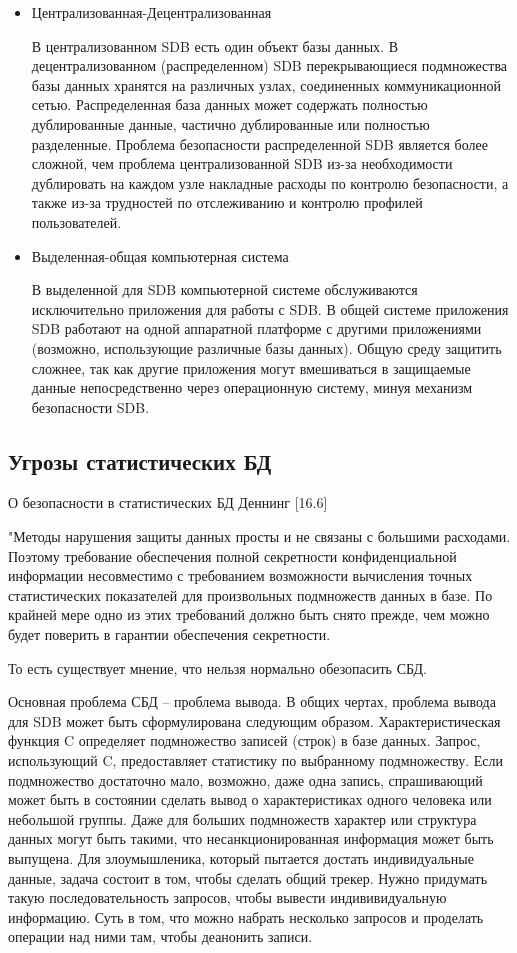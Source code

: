 \begin{itemize}
    \item Централизованная-Децентрализованная

В централизованном SDB есть один объект базы данных. В децентрализованном (распределенном) SDB перекрывающиеся подмножества базы данных хранятся на различных узлах, соединенных коммуникационной сетью. Распределенная база данных может содержать полностью дублированные данные, частично дублированные или полностью разделенные. Проблема безопасности распределенной SDB является более сложной, чем проблема централизованной SDB из-за необходимости дублировать на каждом узле накладные расходы по контролю безопасности, а также из-за трудностей по отслеживанию и контролю профилей пользователей.

	\item Выделенная-общая компьютерная система

В выделенной для SDB компьютерной системе обслуживаются исключительно приложения для работы с SDB. В общей системе приложения SDB работают на одной аппаратной платформе с другими приложениями (возможно, использующие различные базы данных). Общую среду защитить сложнее, так как другие приложения могут вмешиваться в защищаемые данные непосредственно через операционную систему, минуя механизм безопасности SDB.
\end{itemize}
\subsection{Угрозы статистических БД}

О безопасности в статистических БД  Деннинг [16.6]
\begin{grayquote}
"Методы нарушения защиты данных просты и не связаны с большими расходами. Поэтому требование обеспечения полной секретности конфиденциальной информации несовместимо с требованием возможности вычисления точных статистических показателей для произвольных подмножеств данных в базе. По крайней мере одно из этих требований должно быть снято прежде, чем можно будет поверить в гарантии обеспечения секретности.
\end{grayquote}
То есть существует мнение, что нельзя нормально обезопасить СБД.

Основная проблема СБД -- проблема вывода.
В общих чертах, проблема вывода для SDB может быть сформулирована следующим образом. Характеристическая функция C определяет подмножество записей (строк) в базе данных. Запрос, использующий C, предоставляет статистику по выбранному подмножеству. Если подмножество достаточно мало, возможно, даже одна запись, спрашивающий может быть в состоянии сделать вывод о характеристиках одного человека или небольшой группы. Даже для больших подмножеств характер или структура данных могут быть такими, что несанкционированная информация может быть выпущена.
Для злоумышленика, который пытается достать индивидуальные данные, задача состоит в том, чтобы сделать общий трекер.
Нужно придумать такую последовательность запросов, чтобы вывести индививидуальную информацию.
Суть в том, что можно набрать несколько запросов и проделать операции над ними там, чтобы деанонить записи.

